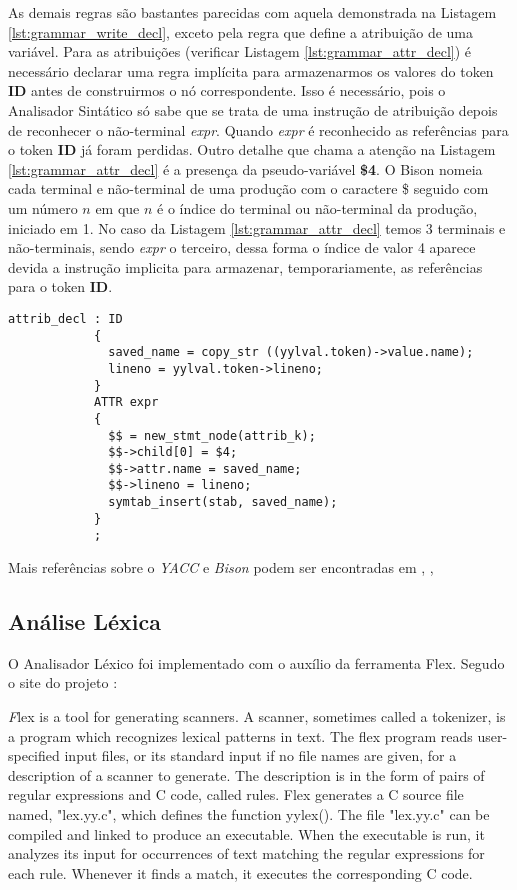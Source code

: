 As demais regras são bastantes parecidas com aquela demonstrada na Listagem
\ref{lst:grammar_write_decl}, exceto pela regra que define a atribuição de uma
variável. Para as atribuições (verificar Listagem \ref{lst:grammar_attr_decl})
é necessário declarar uma regra implícita para armazenarmos os valores do token
\textbf{ID} antes de construirmos o nó correspondente. Isso é necessário, pois
o Analisador Sintático só sabe que se trata de uma instrução de atribuição
depois de reconhecer o não-terminal \emph{expr}. Quando \emph{expr} é
reconhecido as referências para o token \textbf{ID} já foram perdidas. Outro
detalhe que chama a atenção na Listagem \ref{lst:grammar_attr_decl} é a
presença da pseudo-variável \textbf{\$4}. O Bison nomeia cada terminal e
não-terminal de uma produção com o caractere \$ seguido com um número $n$ em
que $n$ é o índice do terminal ou não-terminal da produção, iniciado em 1. No
caso da Listagem \ref{lst:grammar_attr_decl} temos 3 terminais e
não-terminais, sendo \emph{expr} o terceiro, dessa forma o índice de valor 4
aparece devida a instrução implicita para armazenar, temporariamente, as
referências para o token \textbf{ID}.

\begin{lstlisting}[label=lst:grammar_attr_decl,caption=Instrução de Atribuição]
attrib_decl : ID
            {
              saved_name = copy_str ((yylval.token)->value.name);
              lineno = yylval.token->lineno;
            }
            ATTR expr
            {
              $$ = new_stmt_node(attrib_k);
              $$->child[0] = $4;
              $$->attr.name = saved_name;
              $$->lineno = lineno;
              symtab_insert(stab, saved_name);
            }
            ;
\end{lstlisting}

Mais referências sobre o \emph{YACC} e \emph{Bison} podem ser encontradas em
, , 

\subsection{Análise Léxica}
O Analisador Léxico foi implementado com o auxílio da ferramenta Flex. Segudo
o site do projeto \cite{flex-project}:

\begin{citacao}{4cm}{0cm}\footnotesize \emph
  Flex is a tool for generating scanners. A scanner, sometimes called a
  tokenizer, is a program which recognizes lexical patterns in text. The flex
  program reads user-specified input files, or its standard input if no file
  names are given, for a description of a scanner to generate. The description
  is in the form of pairs of regular expressions and C code, called rules. Flex
  generates a C source file named, "lex.yy.c", which defines the function
  yylex(). The file "lex.yy.c" can be compiled and linked to produce an
  executable. When the executable is run, it analyzes its input for occurrences
  of text matching the regular expressions for each rule. Whenever it finds a
  match, it executes the corresponding C code.
\end{citacao}

